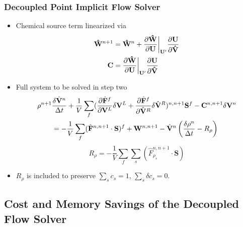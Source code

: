 \documentclass{beamer}
\begin{document}
\begin{frame}
  \frametitle{Decoupled Point Implicit Flow Solver}
  \vspace{-0.2cm}
  \begin{itemize}
    \item Chemical source term linearized via
    \vspace{-0.1cm}
    \begin{align*}
      \mathbf{\hat{W}}^{n+1} &= \mathbf{\hat{W}}^n+\frac{\partial
      \mathbf{\hat{W}}}{\partial \mathbf{U}}\bigg|_{\mathbf{U}'} \frac{\partial
      \mathbf{U}}{\partial \mathbf{\hat{V}}} \\
       \mathbf C &= \frac{\partial \mathbf{\hat{W}}}{\partial
       \mathbf{U}}\bigg|_{\mathbf{U}'} \frac{\partial \mathbf{U}}{\partial
       \mathbf{\hat{V}}}
    \end{align*}
    \item Full system to be solved in step two
    \vspace{-0.2cm}
    \begin{gather*}
      \begin{split} \rho^{n+1}&\frac{\delta \hat{\mathbf V}^n}{\Delta t}
        +\frac{1}{V}\sum\limits_{f}(\frac{\partial \hat{\mathbf F}^f}{\partial
        \mathbf V^L}\delta \mathbf V^L +\frac{\partial
        \hat{\mathbf F}^f}{\partial \hat{\mathbf V}^R}\delta
        \hat{\mathbf V}^R)^{n, n+1}\mathbf S^f - \mathbf C^{n, n+1}\delta\mathbf V^n \\ &=
        -\frac{1}{V}\sum\limits_{f}(\hat{\mathbf F}^{n,n+1}\cdot\mathbf S)^f +
        \mathbf W^{n, n+1} -\hat{\mathbf V}^n\left(\frac{\delta \rho^n}{\Delta t} -
        R_\rho\right)
      \end{split} \\ 
    \end{gather*}
    \vspace{-1.4cm}
    \[
      R_\rho = -\frac{1}{V}\sum\limits_{f}{\sum\limits_{s}
      {(\hat{F}_{\rho_s}^{n,n+1}\cdot\mathbf{S})}}
    \]
  \item $R_\rho$ is included to preserve $\sum\limits_{s}{c_s}=1$, $\sum\limits_{s}{\delta c_s}=0$.
  \end{itemize}
\end{frame}

\subsection{Cost and Memory Savings of the Decoupled Flow Solver}
\end{document}
